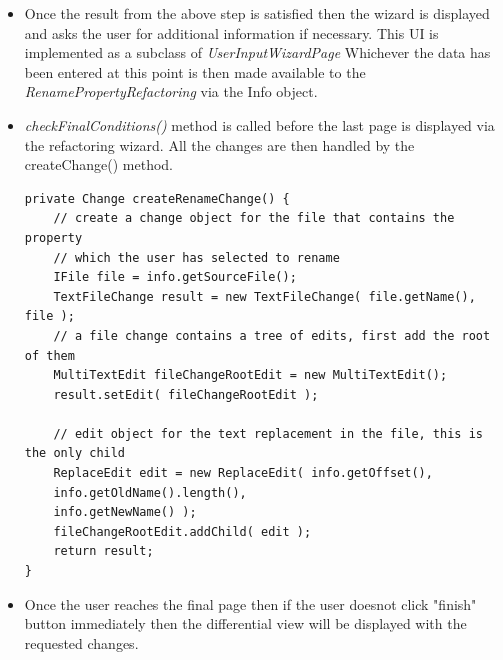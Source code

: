 \begin{itemize}
\item Once the result from the above step is satisfied then
the wizard is displayed and asks the user for additional information
if necessary. This UI is implemented as a subclass of \emph{UserInputWizardPage}
Whichever the data has been entered at this point is then
made available to the \emph{RenamePropertyRefactoring} via the
Info object.
\item \emph{checkFinalConditions()} method is called before the
last page is displayed via the refactoring wizard. All the changes
are then handled by the createChange() method.

  \begin{lstlisting}[caption={Class RenamePropertyDelegate(core)},label={lst:refacDel}]
private Change createRenameChange() {
	// create a change object for the file that contains the property
	// which the user has selected to rename
	IFile file = info.getSourceFile();
	TextFileChange result = new TextFileChange( file.getName(), file );
	// a file change contains a tree of edits, first add the root of them
	MultiTextEdit fileChangeRootEdit = new MultiTextEdit();
	result.setEdit( fileChangeRootEdit );
	
	// edit object for the text replacement in the file, this is the only child
	ReplaceEdit edit = new ReplaceEdit( info.getOffset(),
	info.getOldName().length(),
	info.getNewName() );
	fileChangeRootEdit.addChild( edit );
	return result;
}
  \end{lstlisting}
  \item  Once the user reaches the final page then if the user
  doesnot click "finish" button immediately then the differential
  view will be displayed with the requested changes.
  \end{itemize}

 
 



